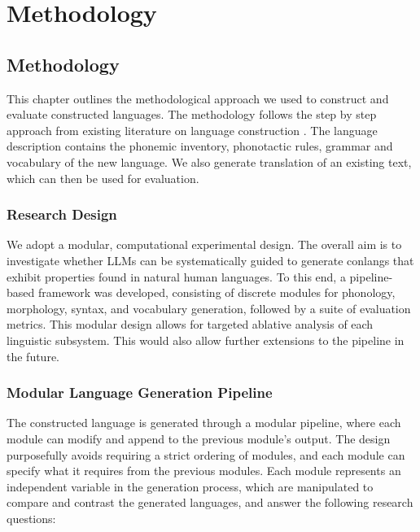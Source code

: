 \chapter{Methodology}\label{chapter:methodology}


\section{Methodology}

This chapter outlines the methodological approach we used to construct and evaluate constructed languages. The methodology follows the step 
by step approach from existing literature on language construction \cite{petersonArtLanguageInvention2015,rosenfelder2010language}. The language 
description contains the phonemic inventory, phonotactic rules, grammar and vocabulary of the new language. We also generate translation of an
existing text, which can then be used for evaluation.

\subsection{Research Design}

We adopt a modular, computational experimental design. The overall aim is to investigate whether LLMs can be systematically guided 
to generate conlangs that exhibit properties found in natural human languages. To this end, a pipeline-based framework was developed, 
consisting of discrete modules for phonology, morphology, syntax, and vocabulary generation, followed by a suite of evaluation metrics. 
This modular design allows for targeted ablative analysis of each linguistic subsystem. This would also allow further extensions to the pipeline 
in the future.

\subsection{Modular Language Generation Pipeline}
The constructed language is generated through a modular pipeline, where each module can modify and append to the previous module's output.
The design purposefully avoids requiring a strict ordering of modules, and each module can specify what it requires from the previous modules.
Each module represents an independent variable in the generation process, which are manipulated to compare and contrast the generated languages, and 
answer the following research questions:

